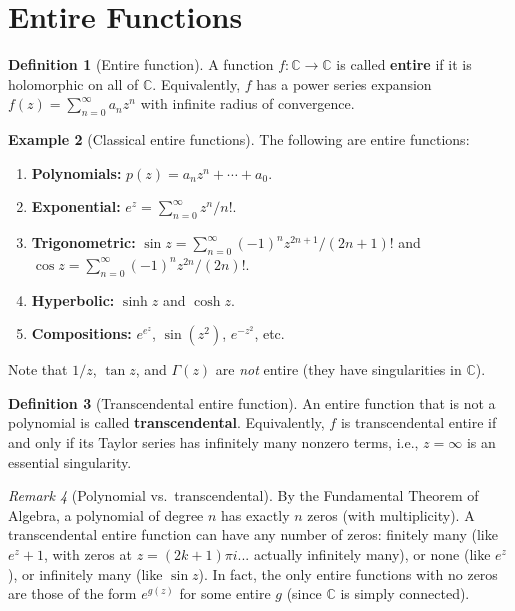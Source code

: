 \documentclass[12pt,a4paper,openany]{book}
\theoremstyle{definition}
\newtheorem{definition}{Definition}[chapter]
\newtheorem{example}[definition]{Example}
\theoremstyle{plain}
\theoremstyle{remark}
\newtheorem{remark}[definition]{Remark}
\newcommand{\C}{\mathbb{C}}
\begin{document}
\section{Entire Functions}\label{sec:entire-functions}

\begin{definition}[Entire function]\label{def:entire-function}
A function $f\colon \C \to \C$ is called \textbf{entire} if it is
holomorphic on all of $\C$. Equivalently, $f$ has a power series
expansion $f(z) = \sum_{n=0}^{\infty} a_n z^n$ with infinite radius
of convergence.
\end{definition}

\begin{example}[Classical entire functions]\label{ex:classical-entire}
The following are entire functions:
\begin{enumerate}[label=(\roman*)]
  \item \textbf{Polynomials:} $p(z) = a_n z^n + \cdots + a_0$.
  \item \textbf{Exponential:} $e^z = \sum_{n=0}^{\infty} z^n/n!$.
  \item \textbf{Trigonometric:} $\sin z = \sum_{n=0}^{\infty} (-1)^n z^{2n+1}/(2n+1)!$
    and $\cos z = \sum_{n=0}^{\infty} (-1)^n z^{2n}/(2n)!$.
  \item \textbf{Hyperbolic:} $\sinh z$ and $\cosh z$.
  \item \textbf{Compositions:} $e^{e^z}$, $\sin(z^2)$, $e^{-z^2}$, etc.
\end{enumerate}
Note that $1/z$, $\tan z$, and $\Gamma(z)$ are \emph{not} entire
(they have singularities in $\C$).
\end{example}

\begin{definition}[Transcendental entire function]\label{def:transcendental-entire}
An entire function that is not a polynomial is called \textbf{transcendental}.
Equivalently, $f$ is transcendental entire if and only if its Taylor series
has infinitely many nonzero terms, i.e., $z = \infty$ is an essential singularity.
\end{definition}

\begin{remark}[Polynomial vs.\ transcendental]\label{rem:poly-vs-trans}
By the Fundamental Theorem of Algebra, a polynomial of degree $n$ has
exactly $n$ zeros (with multiplicity). A transcendental entire function
can have any number of zeros: finitely many (like $e^z + 1$, with
zeros at $z = (2k+1)\pi i$... actually infinitely many), or none
(like $e^z$), or infinitely many (like $\sin z$).
In fact, the only entire functions with no zeros are those of the form
$e^{g(z)}$ for some entire $g$ (since $\C$ is simply connected).
\end{remark}
\end{document}
